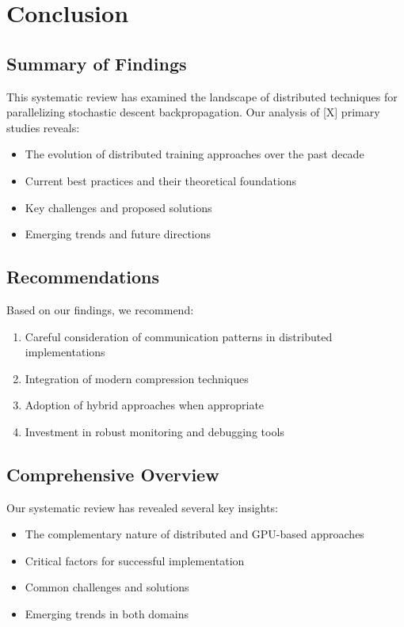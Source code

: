 \section{Conclusion}
\label{sec:conclusion}

\subsection{Summary of Findings}
This systematic review has examined the landscape of distributed techniques for parallelizing stochastic descent backpropagation. Our analysis of [X] primary studies reveals:
\begin{itemize}
    \item The evolution of distributed training approaches over the past decade
    \item Current best practices and their theoretical foundations
    \item Key challenges and proposed solutions
    \item Emerging trends and future directions
\end{itemize}

\subsection{Recommendations}
Based on our findings, we recommend:
\begin{enumerate}
    \item Careful consideration of communication patterns in distributed implementations
    \item Integration of modern compression techniques
    \item Adoption of hybrid approaches when appropriate
    \item Investment in robust monitoring and debugging tools
\end{enumerate}


\subsection{Comprehensive Overview}
Our systematic review has revealed several key insights:
\begin{itemize}
    \item The complementary nature of distributed and GPU-based approaches
    \item Critical factors for successful implementation
    \item Common challenges and solutions
    \item Emerging trends in both domains
\end{itemize}

